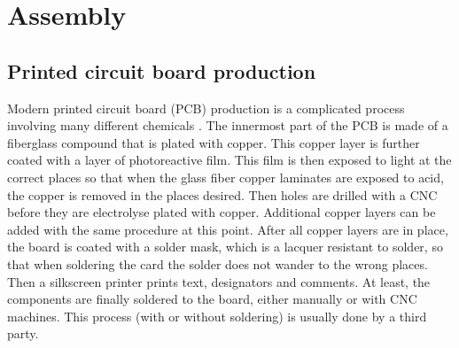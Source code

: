 \section{Assembly}

\subsection{Printed circuit board production}
Modern printed circuit board (PCB) production is a complicated process involving many different chemicals \citep{pcbprod}. The innermost part of the PCB is made of a fiberglass compound that is plated with copper. This copper layer is further coated with a layer of photoreactive film. This film is then exposed to light at the correct places so that when the glass fiber copper laminates are exposed to acid, the copper is removed in the places desired. Then holes are drilled with a CNC before they are electrolyse plated with copper. Additional copper layers can be added with the same procedure at this point. After all copper layers are in place, the board is coated with a solder mask, which is a lacquer resistant to solder, so that when soldering the card the solder does not wander to the wrong places. Then a silkscreen printer prints text, designators and comments. At least, the components are finally soldered to the board, either manually or with CNC machines. This process (with or without soldering) is usually done by a third party.